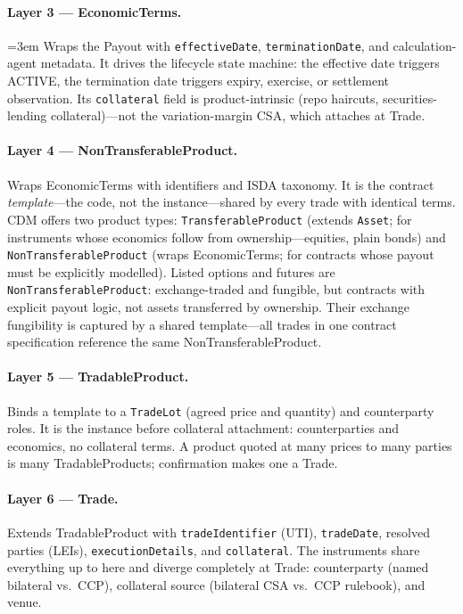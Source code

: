 \paragraph{Layer 3 --- EconomicTerms.} {\emergencystretch=3em Wraps the Payout with \texttt{effective\allowbreak Date}, \texttt{termination\allowbreak Date}, and calculation-agent metadata. It drives the lifecycle state machine: the effective date triggers ACTIVE, the termination date triggers expiry, exercise, or settlement observation. Its \texttt{collateral} field is product-intrinsic (repo haircuts, securities-lending collateral)---\allowbreak not the variation-margin CSA, which attaches at Trade.\par}

\paragraph{Layer 4 --- NonTransferableProduct.} Wraps EconomicTerms with identifiers and ISDA taxonomy. It is the contract \emph{template}---the code, not the instance---shared by every trade with identical terms. CDM offers two product types: \texttt{Transferable\allowbreak Product} (extends \texttt{Asset}; for instruments whose economics follow from ownership---equities, plain bonds) and \texttt{Non\allowbreak Transferable\allowbreak Product} (wraps EconomicTerms; for contracts whose payout must be explicitly modelled). Listed options and futures are \texttt{Non\allowbreak Transferable\allowbreak Product}: exchange-traded and fungible, but contracts with explicit payout logic, not assets transferred by ownership. Their exchange fungibility is captured by a shared template---all trades in one contract specification reference the same NonTransferableProduct.

\paragraph{Layer 5 --- TradableProduct.} Binds a template to a \texttt{TradeLot} (agreed price and quantity) and counterparty roles. It is the instance before collateral attachment: counterparties and economics, no collateral terms. A product quoted at many prices to many parties is many TradableProducts; confirmation makes one a Trade.

\paragraph{Layer 6 --- Trade.} Extends TradableProduct with \texttt{tradeIdentifier} (UTI), \texttt{tradeDate}, resolved parties (LEIs), \texttt{executionDetails}, and \texttt{collateral}. The instruments share everything up to here and diverge completely at Trade: counterparty (named bilateral vs.\ CCP), collateral source (bilateral CSA vs.\ CCP rulebook), and venue.

